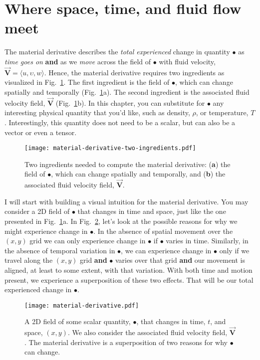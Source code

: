 \section{Where space, time, and fluid flow meet}

The material derivative describes the \textit{total experienced} change in quantity $\bullet$ as \textit{time goes on} \textbf{and} as we \textit{move} across the field of $\bullet$ with fluid velocity, $\vec{\bm{V}} = \langle u, \upsilon, w \rangle$. Hence, the material derivative requires two ingredients as visualized in Fig.~\ref{fig:material-derivative-two-ingredients}. The first ingredient is the field of $\bullet$, which can change spatially and temporally (Fig.~\ref{fig:material-derivative-two-ingredients}a). The second ingredient is the associated fluid velocity field, $\vec{\bm{V}}$ (Fig.~\ref{fig:material-derivative-two-ingredients}b). In this chapter, you can substitute for $\bullet$ any interesting physical quantity that you'd like, such as density, $\rho$, or temperature, $T$. Interestingly, this quantity does not need to be a scalar, but can also be a vector or even a tensor.
\begin{figure}[H]
\centering\texttt{[image: material-derivative-two-ingredients.pdf]}
\caption{Two ingredients needed to compute the material derivative: (\textbf{a}) the field of $\bullet$, which can change spatially and temporally, and (\textbf{b}) the associated fluid velocity field, $\vec{\bm{V}}$.}
\label{fig:material-derivative-two-ingredients}
\end{figure}

I will start with building a visual intuition for the material derivative. You may consider a 2D field of $\bullet$ that changes in time and space, just like the one presented in Fig.~\ref{fig:material-derivative-two-ingredients}a. In Fig.~\ref{fig:material-derivative-example}, let's look at the possible reasons for why we might experience change in $\bullet$. In the absence of spatial movement over the $(x,y)$ grid we can only experience change in $\bullet$ if $\bullet$ varies in time. Similarly, in the absence of temporal variation in $\bullet$, we can experience change in $\bullet$ only if we travel along the $(x,y)$ grid \textbf{and} $\bullet$ varies over that grid \textbf{and} our movement is aligned, at least to some extent, with that variation. With both time and motion present, we experience a superposition of these two effects. That will be our total experienced change in $\bullet$.
\begin{figure}[H]
\centering\texttt{[image: material-derivative.pdf]}
\caption{A 2D field of some scalar quantity, $\bullet$, that changes in time, $t$, and space, $(x, y)$. We also consider the associated fluid velocity field, $\vec{\bm{V}}$. The material derivative is a superposition of two reasons for why $\bullet$ can change.}			
\label{fig:material-derivative-example}
\end{figure}

